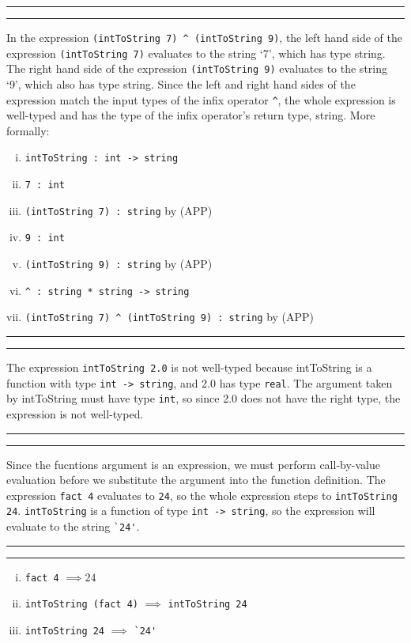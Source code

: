 \documentclass[11pt]{article}
\newcounter{questionCounter}
\newcounter{partCounter}[questionCounter]
\newenvironment{question}[2][\arabic{questionCounter}]{%
    \setcounter{partCounter}{0}%
    \vspace{.25in} \hrule \vspace{0.5em}%
        \noindent{\bf #2}%
    \vspace{0.8em} \hrule \vspace{.10in}%
    \addtocounter{questionCounter}{1}%
}{}
\begin{document}
\newpage

\begin{question}{Task 3.1}
In the expression \verb!(intToString 7) ^ (intToString 9)!, the left hand side of the
expression \verb!(intToString 7)! evaluates to
the string `7', which has type string. The right hand side of the
expression \verb!(intToString 9)! evaluates to
the string `9', which also has type string. Since the left and right
hand sides of the expression match the input types of the infix
operator \verb!^!, the whole expression is
well-typed and has the type of the infix operator's return type,
string. More formally:
\begin{enumerate}[(i)]
  \item \verb!intToString : int -> string!
  \item \verb!7 : int!
  \item \verb!(intToString 7) : string! by
  (APP)
  \item \verb!9 : int!
  \item \verb!(intToString 9) : string! by
  (APP)
  \item \verb!^ : string * string -> string!
  \item \verb!(intToString 7) ^ (intToString 9) : string! by (APP)
\end{enumerate}
\end{question}

\begin{question}{Task 3.2}
  The expression \verb!intToString 2.0! is not
  well-typed because intToString is a function with
  type \verb!int -> string!, and 2.0 has
  type \verb!real!. The argument taken by
  intToString must have type \verb!int!, so
  since 2.0 does not have the right type, the expression is not
  well-typed.
\end{question}

\newpage

\begin{question}{Task 4.1}
Since the fucntions argument is an expression, we must perform
call-by-value evaluation before we substitute the argument into the
function definition. The expression \verb!fact 4! evaluates to \verb!24!, so
  the whole expression steps to \verb!intToString 24!. \verb!intToString! is a
  function of type \verb!int -> string!, so the
  expression will evaluate to the string \verb!`24'!.
\end{question}

\begin{question}{Task 4.2}
\begin{enumerate}[(i)]
  \item \verb!fact 4! $\implies 24$
  \item \verb!intToString (fact 4)!
    $\implies$ \verb!intToString 24!
  \item \verb!intToString 24!
  $\implies$ \verb!`24'! 
\end{enumerate}
\end{question}
\end{document}
